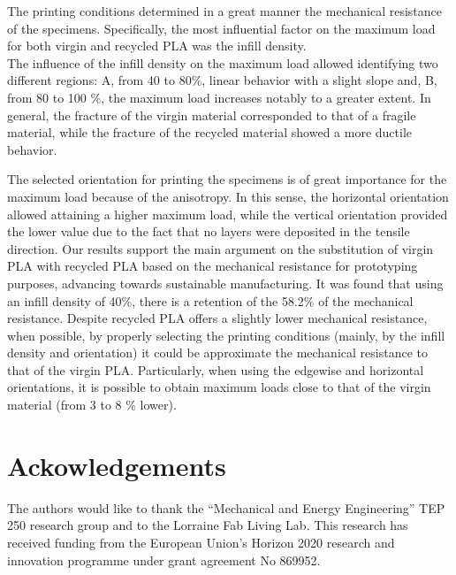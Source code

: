 \documentclass[]{interact}
\theoremstyle{plain}%
\theoremstyle{definition}
\theoremstyle{remark}
\begin{document}
The printing conditions determined in a great manner the mechanical
resistance of the specimens. Specifically, the most influential factor
on the maximum load for both virgin and recycled PLA was the infill
density.\\
The influence of the infill density on the maximum load allowed
identifying two different regions: A, from 40 to 80\%, linear behavior
with a slight slope and, B, from 80 to 100 \%, the maximum load
increases notably to a greater extent. In general, the fracture of the
virgin material corresponded to that of a fragile material, while the
fracture of the recycled material showed a more ductile behavior.

The selected orientation for printing the specimens is of great
importance for the maximum load because of the anisotropy. In this
sense, the horizontal orientation allowed attaining a higher maximum
load, while the vertical orientation provided the lower value due to the
fact that no layers were deposited in the tensile direction. Our results
support the main argument on the substitution of virgin PLA with
recycled PLA based on the mechanical resistance for prototyping
purposes, advancing towards sustainable manufacturing. It was found that
using an infill density of 40\%, there is a retention of the 58.2\% of
the mechanical resistance. Despite recycled PLA offers a slightly lower
mechanical resistance, when possible, by properly selecting the printing
conditions (mainly, by the infill density and orientation) it could be
approximate the mechanical resistance to that of the virgin PLA.
Particularly, when using the edgewise and horizontal orientations, it is
possible to obtain maximum loads close to that of the virgin material
(from 3 to 8 \% lower).

\hypertarget{ackowledgements}{%
\section{Ackowledgements}\label{ackowledgements}}

The authors would like to thank the ``Mechanical and Energy
Engineering'' TEP 250 research group and to the Lorraine Fab Living Lab.
This research has received funding from the European Union's Horizon
2020 research and innovation programme under grant agreement No 869952.



\end{document}
